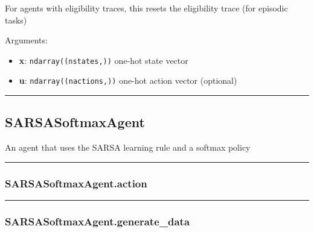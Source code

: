 For agents with eligibility traces, this resets the eligibility trace
(for episodic tasks)

Arguments:

\begin{itemize}
\tightlist
\item
  \textbf{x}: \texttt{ndarray((nstates,))} one-hot state vector
\item
  \textbf{u}: \texttt{ndarray((nactions,))} one-hot action vector
  (optional)
\end{itemize}

\begin{center}\rule{0.5\linewidth}{\linethickness}\end{center}

\hypertarget{sarsasoftmaxagent}{%
\subsection{SARSASoftmaxAgent}\label{sarsasoftmaxagent}}

\begin{Shaded}
\begin{Highlighting}[]
\end{Highlighting}
\end{Shaded}

An agent that uses the SARSA learning rule and a softmax policy

\begin{center}\rule{0.5\linewidth}{\linethickness}\end{center}

\hypertarget{sarsasoftmaxagent.action}{%
\subsubsection{SARSASoftmaxAgent.action}\label{sarsasoftmaxagent.action}}

\begin{Shaded}
\begin{Highlighting}[]
\end{Highlighting}
\end{Shaded}

\begin{center}\rule{0.5\linewidth}{\linethickness}\end{center}

\hypertarget{sarsasoftmaxagent.generate_data}{%
\subsubsection{SARSASoftmaxAgent.generate\_data}\label{sarsasoftmaxagent.generate_data}}

